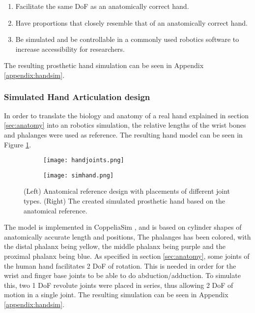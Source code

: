 \documentclass[../main.tex]{subfiles}
\begin{document}
\begin{enumerate}
\item Facilitate the same DoF as an anatomically correct hand.
\item Have proportions that closely resemble that of an anatomically correct hand.
\item Be simulated and be controllable in a commonly used robotics software to increase accessibility for researchers.
\end{enumerate}

The resulting prosthetic hand simulation can be seen in Appendix \ref{appendix:handsim}.

\subsubsection{Simulated Hand Articulation design}

In order to translate the biology and anatomy of a real hand explained in section \ref{sec:anatomy} into an robotics simulation, the relative lengths of the wrist bones and phalanges were used as reference.
The resulting hand model can be seen in Figure \ref{fig:simdesignandimpl}.

\begin{figure}
    \centering
    \begin{subfigure}[b]{0.49\textwidth}
        \centering
        \texttt{[image: handjoints.png]}
    \end{subfigure}
    \hfill
    \centering
    \begin{subfigure}[b]{0.49\textwidth}
        \centering
        \texttt{[image: simhand.png]}
    \end{subfigure}
    \caption{(Left) Anatomical reference design with placements of different joint types. (Right) The  created simulated prosthetic hand based on the anatomical reference.}
    \label{fig:simdesignandimpl}
\end{figure}

The model is implemented in CoppeliaSim \cite{coppeliasim}, and is based on cylinder shapes of anatomically accurate length and positions,
The phalanges has been colored, with the distal phalanx being yellow, the middle phalanx being purple and the proximal phalanx being blue.
As specified in section \ref{sec:anatomy}, some joints of the human hand facilitates 2 DoF of rotation.
This is needed in order for the wrist and finger base joints to be able to do \gls{abduction/adduction}.
To simulate this, two 1 DoF revolute joints were placed in series, thus allowing 2 DoF of motion in a single joint.
The resulting simulation can be seen in Appendix \ref{appendix:handsim}.

\end{document}

